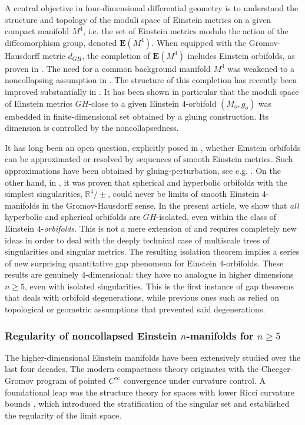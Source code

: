 \documentclass[11pt,reqno]{amsart}
\numberwithin{equation}{section}
\theoremstyle{definition}
\theoremstyle{remark}
\begin{document}
A central objective in four-dimensional differential geometry is to understand the structure and topology of the moduli space of Einstein metrics on a given compact manifold $M^4$, i.e. the set of Einstein metrics modulo the action of the diffeomorphism group, denoted $\mathbf{E}(M^4)$. When equipped with the Gromov-Hausdorff metric $d_{GH}$, the completion of $\mathbf{E}(M^4)$ includes Einstein orbifolds, as proven in \cite{and,bkn,tia}. The need for a common background manifold $M^4$ was weakened to a noncollapsing assumption in \cite{cn}. The structure of this completion has recently been improved substantially in \cite{biq1,biq2,ozu1,ozu2,ozuthese}. It has been shown in particular that the moduli space of Einstein metrics $GH$-close to a given Einstein $4$-orbifold $(M_o,g_o)$ was embedded in finite-dimensional set obtained by a gluing construction. Its dimension is controlled by the noncollapsedness. 

It has long been an open question, explicitly posed in \cite{and94, andsurv}, whether Einstein orbifolds can be approximated or resolved by sequences of smooth Einstein metrics. Such approximations have been obtained by gluing-perturbation, see e.g. \cite{biq1,don,LS}. On the other hand, in \cite{ozu4}, it was proven that spherical and hyperbolic orbifolds with the simplest singularities, $\mathbb{R}^4/\pm$, could never be limits of smooth Einstein $4$-manifolds in the Gromov-Hausdorff sense. In the present article, we show that \textit{all} hyperbolic and spherical orbifolds are $GH$-isolated, even within the class of Einstein $4$-\textit{orbifolds}. This is not a mere extension of \cite{ozu4} and requires completely new ideas in order to deal with the deeply technical case of multiscale trees of singularities and singular metrics. The resulting isolation theorem implies a series of new surprising quantitative gap phenomena for Einstein $4$-orbifolds. These results are genuinely $4$-dimensional: they have no analogue in higher dimensions $n\geqslant5$, even with isolated singularities. This is the first instance of gap theorems that deals with orbifold degenerations, while previous ones such as \cite{hm25} relied on topological or geometric assumptions that prevented said degenerations.


\subsubsection{Regularity of noncollapsed Einstein $n$-manifolds for $n\geqslant5$}

The higher-dimensional Einstein manifolds have been extensively studied over the last four decades. The modern compactness theory originates with the Cheeger-Gromov program of pointed $C^{\infty}$ convergence under curvature control.
A foundational leap was the structure theory for spaces with lower Ricci curvature bounds
\cite{cc, col, cc97,cc00a,cc00b}, which introduced the stratification of the singular set and established the regularity of the limit space. 
\end{document}
